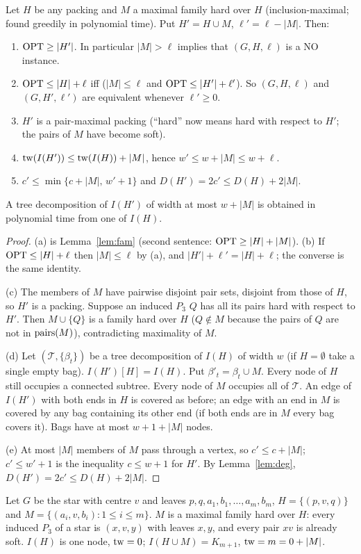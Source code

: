 \begin{lemma}[Maximalisation]\label{lem:MAX}
Let $H$ be any packing and $M$ a maximal family hard over $H$ (inclusion-maximal; found greedily in polynomial time). Put $H'=H\cup M$, $\ell'=\ell-|M|$. Then:
\begin{enumerate}
\item[(a)] $\mathrm{OPT}\ge|H'|$. In particular $|M|>\ell$ implies that $(G,H,\ell)$ is a NO instance.
\item[(b)] $\mathrm{OPT}\le|H|+\ell$ iff ($|M|\le\ell$ and $\mathrm{OPT}\le|H'|+\ell'$). So $(G,H,\ell)$ and $(G,H',\ell')$ are equivalent whenever $\ell'\ge0$.
\item[(c)] $H'$ is a pair-maximal packing (``hard'' now means hard with respect to $H'$; the pairs of $M$ have become soft).
\item[(d)] $\mathrm{tw}(I(H'))\le\mathrm{tw}(I(H))+|M|$, hence $w'\le w+|M|\le w+\ell$.
\item[(e)] $c'\le\min\{c+|M|,\,w'+1\}$ and $D(H')=2c'\le D(H)+2|M|$.
\end{enumerate}
A tree decomposition of $I(H')$ of width at most $w+|M|$ is obtained in polynomial time from one of $I(H)$.
\end{lemma}
\begin{proof}
(a) is Lemma~\ref{lem:fam} (second sentence: $\mathrm{OPT}\ge|H|+|M|$). (b) If $\mathrm{OPT}\le|H|+\ell$ then $|M|\le\ell$ by (a), and $|H'|+\ell'=|H|+\ell$; the converse is the same identity.

(c) The members of $M$ have pairwise disjoint pair sets, disjoint from those of $H$, so $H'$ is a packing. Suppose an induced $P_3$ $Q$ has all its pairs hard with respect to $H'$. Then $M\cup\{Q\}$ is a family hard over $H$ ($Q\notin M$ because the pairs of $Q$ are not in $\mathrm{pairs}(M)$), contradicting maximality of $M$.

(d) Let $(\mathcal T,\{\beta_t\})$ be a tree decomposition of $I(H)$ of width $w$ (if $H=\emptyset$ take a single empty bag). $I(H')[H]=I(H)$. Put $\beta'_t=\beta_t\cup M$. Every node of $H$ still occupies a connected subtree. Every node of $M$ occupies all of $\mathcal T$. An edge of $I(H')$ with both ends in $H$ is covered as before; an edge with an end in $M$ is covered by any bag containing its other end (if both ends are in $M$ every bag covers it). Bags have at most $w+1+|M|$ nodes.

(e) At most $|M|$ members of $M$ pass through a vertex, so $c'\le c+|M|$; $c'\le w'+1$ is the inequality $c\le w+1$ for $H'$. By Lemma~\ref{lem:deg}, $D(H')=2c'\le D(H)+2|M|$.
\end{proof}
\begin{example}\label{ex:maxtight}
Let $G$ be the star with centre $v$ and leaves $p,q,a_1,b_1,\dots,a_m,b_m$, $H=\{(p,v,q)\}$ and $M=\{(a_i,v,b_i):1\le i\le m\}$. $M$ is a maximal family hard over $H$: every induced $P_3$ of a star is $(x,v,y)$ with leaves $x,y$, and every pair $xv$ is already soft. $I(H)$ is one node, $\mathrm{tw}=0$; $I(H\cup M)=K_{m+1}$, $\mathrm{tw}=m=0+|M|$.
\end{example}

